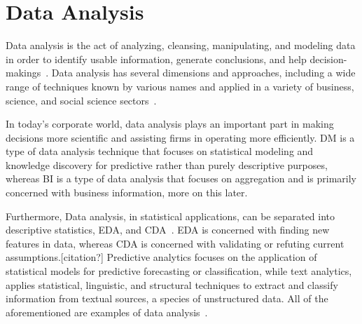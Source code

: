\section{Data Analysis}
Data analysis is the act of analyzing, cleansing, manipulating, and modeling data in order to identify usable information, generate conclusions, and help decision-makings~\cite{Book:sbrown_2014_transforming}.
Data analysis has several dimensions and approaches, including a wide range of techniques known by various names and applied in a variety of business, science, and social science sectors~\cite{Book:pruneau_2017}.

In today's corporate world, data analysis plays an important part in making decisions more scientific and assisting firms in operating more efficiently.
\ac{DM} is a type of data analysis technique that focuses on statistical modeling and knowledge discovery for predictive rather than purely descriptive purposes,
whereas \ac{BI} is a type of data analysis that focuses on aggregation and is primarily concerned with business information, more on this later.

Furthermore, Data analysis, in statistical applications, can be separated into descriptive statistics, \ac{EDA}, and \ac{CDA}~\cite{Book:doing_data_science}. 
\ac{EDA} is concerned with finding new features in data, whereas \ac{CDA} is concerned with validating or refuting current assumptions.[citation?] 
Predictive analytics focuses on the application of statistical models for predictive forecasting or classification, 
while text analytics, applies statistical, linguistic, and structural techniques to extract and classify information from textual sources, a species of unstructured data.
All of the aforementioned are examples of data analysis~\cite{Article:goodnight_2011_the}.

